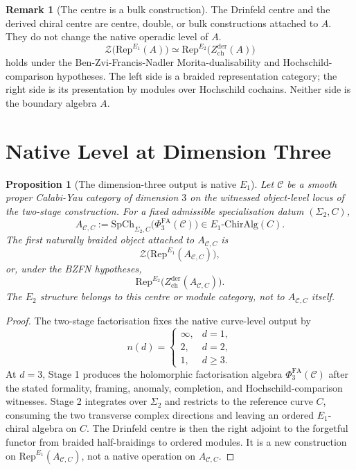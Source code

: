 \documentclass[11pt]{amsart}
\newtheorem{prop}[thm]{Proposition}
\theoremstyle{definition}
\newtheorem{rem}[thm]{Remark}
\newcommand{\cC}{\mathcal C}
\newcommand{\cZ}{\mathcal Z}
\newcommand{\Rep}{\mathrm{Rep}}
\newcommand{\Zderch}{Z^{\mathrm{der}}_{\mathrm{ch}}}
\newcommand{\SpCh}{\mathrm{SpCh}}
\newcommand{\PhiFA}{\Phi^{\mathrm{FA}}}
\begin{document}
\begin{rem}[The centre is a bulk construction]
\label{rem:centre-is-bulk}
The Drinfeld centre and the derived chiral centre are centre, double, or
bulk constructions attached to $A$.  They do not change the native
operadic level of $A$.
\[
  \cZ\bigl(\Rep^{E_1}(A)\bigr)
  \simeq
  \Rep^{E_2}\bigl(\Zderch(A)\bigr)
\]
holds under the Ben-Zvi-Francis-Nadler Morita-dualisability and
Hochschild-comparison hypotheses.  The left side is a braided
representation category; the right side is its presentation by modules
over Hochschild cochains.  Neither side is the boundary algebra $A$.
\end{rem}

\section{Native Level at Dimension Three}
\label{sec:native-level}

\begin{prop}[The dimension-three output is native \(E_1\)]
\label{prop:d3-native-e1}
Let $\cC$ be a smooth proper Calabi-Yau category of dimension $3$ on the
witnessed object-level locus of the two-stage construction.  For a fixed
admissible specialisation datum $(\Sigma_2,C)$,
\[
  A_{\cC,C}
  :=
  \SpCh_{\Sigma_2,C}\bigl(\PhiFA_3(\cC)\bigr)
  \in E_1\text{-}\mathrm{ChirAlg}(C).
\]
The first naturally braided object attached to $A_{\cC,C}$ is
\[
  \cZ\bigl(\Rep^{E_1}(A_{\cC,C})\bigr),
\]
or, under the BZFN hypotheses,
\[
  \Rep^{E_2}\bigl(\Zderch(A_{\cC,C})\bigr).
\]
The $E_2$ structure belongs to this centre or module category, not to
$A_{\cC,C}$ itself.
\end{prop}

\begin{proof}
The two-stage factorisation fixes the native curve-level output by
\[
  n(d)=
  \begin{cases}
    \infty,& d=1,\\
    2,& d=2,\\
    1,& d\geq 3.
  \end{cases}
\]
At $d=3$, Stage 1 produces the holomorphic factorisation algebra
$\PhiFA_3(\cC)$ after the stated formality, framing, anomaly, completion,
and Hochschild-comparison witnesses.  Stage 2 integrates over
$\Sigma_2$ and restricts to the reference curve $C$, consuming the two
transverse complex directions and leaving an ordered $E_1$-chiral
algebra on $C$.  The Drinfeld centre is then the right adjoint to the
forgetful functor from braided half-braidings to ordered modules.  It is
a new construction on $\Rep^{E_1}(A_{\cC,C})$, not a native operation on
$A_{\cC,C}$.
\end{proof}
\end{document}
